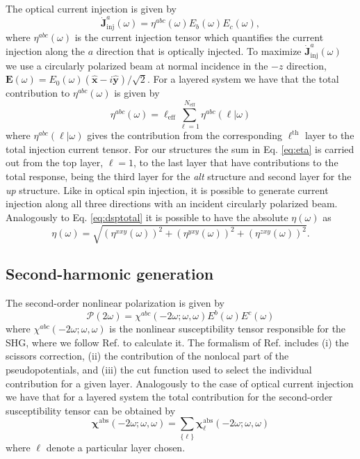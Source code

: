 \documentclass[pss]{wiley2sp} %
\begin{document}
The optical current injection is given \cite{arzatePRB14} by
\begin{equation*}
\mathbf{\dot{J}}^{a}_{\text{inj}}(\omega) =
\eta^{abc}(\omega)E_{b}(\omega)E_{c}(\omega), \label{eq:current}
\end{equation*}
where $\eta^{abc}(\omega)$ is the current injection tensor which quantifies the
current injection along the $a$ direction that is optically injected. To maximize
$\mathbf{\dot{J}}^{a}_{\text{inj}}(\omega)$ we use a 
circularly polarized beam at normal incidence in the $-z$  direction,
$\mathbf{E}(\omega) = E_{0}(\omega)(\mathbf{\hat{x}} -
i\mathbf{\hat{y}})/\sqrt{2}$. For a layered system we have that the total contribution to $
\eta^{abc}(\omega)$ is given \cite{arzatePRB14} by
\begin{equation}\label{eq:eta}
\eta^{abc}(\omega)=
\ell_{\mathrm{eff}}\sum_{\ell=1}^{N_{\mathrm{eff}}}\eta^{abc}(\ell|\omega)
\end{equation}
where $\eta^{abc}(\ell|\omega)$ gives the contribution from the corresponding
$\ell^{\mathrm{th}}$ layer to the total injection current tensor. For our structures
the sum in Eq. \eqref{eq:eta} is carried out from the top layer, $\ell=1$, to
the last layer that have contributions to the total response, being the third layer
for the \emph{alt} structure and second layer for the \emph{up} structure. Like in
optical spin injection, it is possible to generate current injection along all
three directions with an incident circularly polarized beam. Analogously to Eq.
\eqref{eq:dsptotal} it is possible to have the absolute $\eta(\omega)$
\cite{arzatePRB14} as
\begin{equation}\label{eq:etatotal}
\eta(\omega) =
\sqrt{(\eta^{xxy}(\omega))^{2} +
      (\eta^{yxy}(\omega))^{2} +
      (\eta^{zxy}(\omega))^{2}
      }.
\end{equation}


\subsection{Second-harmonic generation}\label{sec:theory-SHG}
The second-order nonlinear polarization is given \cite{andersonPRB15}
by
\begin{equation*}\label{eq:pol}
\mathcal{P}(2\omega) = 
\chi^{abc}(-2\omega;\omega,\omega)E^{b}(\omega)E^{c}(\omega)
\end{equation*} where $\chi^{abc}(-2\omega;\omega,\omega)$ is the nonlinear
susceptibility tensor responsible for the SHG, where we follow Ref.
\cite{andersonPRB15} to calculate it. The 
formalism of Ref. \cite{andersonPRB15} includes (i) the scissors correction,
(ii) the contribution of the nonlocal part of the pseudopotentials, and (iii)
the cut function used to select the individual contribution for a given layer.
Analogously to the case of optical current injection we have that for a layered
system the total contribution for the second-order susceptibility tensor can be
obtained by
\begin{equation}
\boldsymbol{\chi}^{\mathrm{abs}}(-2\omega;\omega,\omega) = \sum_{\{\ell\}} \boldsymbol{\chi}^{\mathrm{abs}}_{\ell}(-2\omega;\omega,\omega)
\end{equation}
where $\ell$ denote a particular layer chosen.
\end{document}
